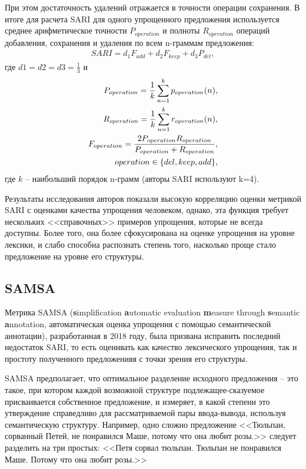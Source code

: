 При этом достаточность удалений отражается в точности операции сохранения. 
В итоге для расчета SARI для одного упрощенного предложения используется среднее арифметическое точности $P_{operation}$ и полноты $R_{operation}$ операций добавления, сохранения и удаления по всем n-граммам предложения:
\begin{eqnarray} 
	\label{eq:13}
	SARI = d_{1}F_{add} + d_{2}F_{keep} + d_{3}P_{del} ,
\end{eqnarray}
где $d1 = d2 = d3 = \frac{1}{3}$ и 
\begin{eqnarray} 
	\label{eq:14}
	P_{operation} = \frac{1}{k}\sum\limits_{n=1}^{k}p_{operation}(n) ,\\
	R_{operation} = \frac{1}{k}\sum\limits_{n=1}^{k}r_{operation}(n) ,\\
	F_{operation} = \frac{2P_{operation}R_{operation}}{P_{operation} + R_{operation}},  \\
	operation\in{\left\lbrace del, keep, add\right\rbrace } \notag,
\end{eqnarray}
где $k$ -- наибольший порядок n-грамм (авторы SARI используют k=4).

Результаты исследования авторов показали высокую корреляцию оценки метрикой SARI с оценками качества упрощения человеком, однако, эта функция требует нескольких <<справочных>> примеров упрощения, которые не всегда доступны. Более того, она более сфокусирована на оценке упрощения на уровне лексики, и слабо способна распознать степень того, насколько проще стало предложение на уровне его структуры.

\subsection{SAMSA}

Метрика SAMSA (\textbf{s}implification \textbf{a}utomatic evaluation \textbf{m}easure through \textbf{s}emantic \textbf{a}nnotation, автоматическая оценка упрощения с помощью семантической аннотации), разработанная в 2018 году, была призвана исправить последний недостаток SARI, то есть оценивать как качество лексического упрощения, так и простоту полученного предложенияя с точки зрения его структуры\cite{sulem_semantic_2018}.

SAMSA предполагает, что оптимальное разделение исходного предложения -- это такое, при котором каждой возможной структуре подлежащее-сказуемое присваивается собственное предложение, и измеряет, в какой степени это утверждение справедливо для рассматриваемой пары ввода-вывода, используя семантическую структуру. Например, одно сложно предложение <<Тюльпан, сорванный Петей, не понравился Маше, потому что она любит розы.>> следует разделить на три простых: <<Петя сорвал тюльпан. Тюльпан не понравился Маше. Потому что она любит розы.>>

